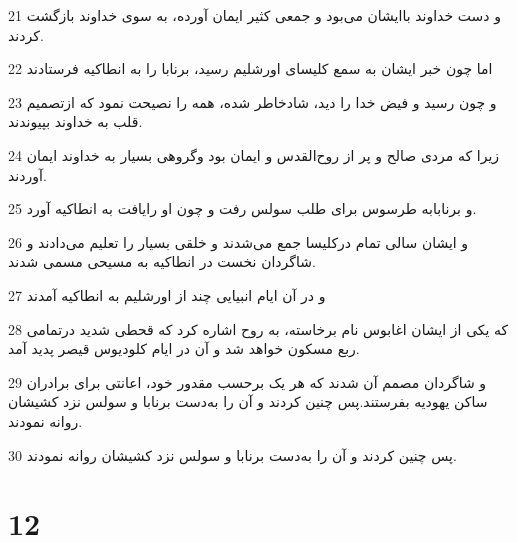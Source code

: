 \par 21 و دست خداوند باایشان می‌بود و جمعی کثیر ایمان آورده، به سوی خداوند بازگشت کردند.
\par 22 اما چون خبر ایشان به سمع کلیسای اورشلیم رسید، برنابا را به انطاکیه فرستادند
\par 23 و چون رسید و فیض خدا را دید، شادخاطر شده، همه را نصیحت نمود که ازتصمیم قلب به خداوند بپیوندند.
\par 24 زیرا که مردی صالح و پر از روح‌القدس و ایمان بود وگروهی بسیار به خداوند ایمان آوردند.
\par 25 و برنابابه طرسوس برای طلب سولس رفت و چون او رایافت به انطاکیه آورد.
\par 26 و ایشان سالی تمام درکلیسا جمع می‌شدند و خلقی بسیار را تعلیم می‌دادند و شاگردان نخست در انطاکیه به مسیحی مسمی شدند.
\par 27 و در آن ایام انبیایی چند از اورشلیم به انطاکیه آمدند
\par 28 که یکی از ایشان اغابوس نام برخاسته، به روح اشاره کرد که قحطی شدید درتمامی ربع مسکون خواهد شد و آن در ایام کلودیوس قیصر پدید آمد.
\par 29 و شاگردان مصمم آن شدند که هر یک برحسب مقدور خود، اعانتی برای برادران ساکن یهودیه بفرستند.پس چنین کردند و آن را به‌دست برنابا و سولس نزد کشیشان روانه نمودند.
\par 30 پس چنین کردند و آن را به‌دست برنابا و سولس نزد کشیشان روانه نمودند.

\chapter{12}

